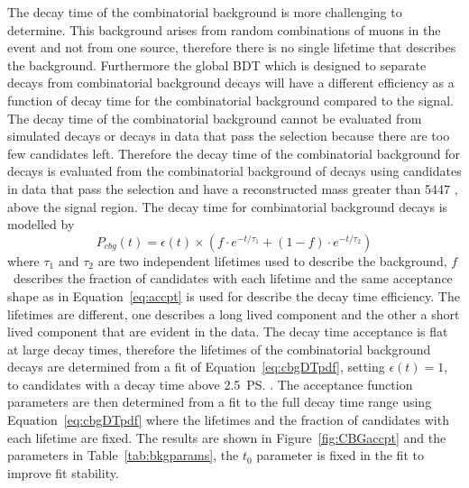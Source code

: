The decay time \pdf of the combinatorial background is more challenging to determine. This background arises from random combinations of muons in the event and not from one source, therefore there is no single lifetime that describes the background. Furthermore the global BDT which is designed to separate \bsmumu decays from combinatorial background decays will have a different efficiency as a function of decay time for the combinatorial background compared to the \bsmum signal. The decay time \pdf of the combinatorial background cannot be evaluated from simulated decays or decays in data that pass the \bsmumu selection because there are too few candidates left. %
Therefore the decay time \pdf of the combinatorial background for \bsmumu decays is evaluated from the combinatorial background of \bhh decays using candidates in data that pass the \bhh selection and have a reconstructed mass greater than 5447 \mevcc, above the \bs signal region. The decay time \pdf for combinatorial background decays is modelled by
\begin{equation}
P_{cbg}(t) = \epsilon(t)\times \left( f \cdot e^{-t/\tau_{1}} + (1-f)\cdot e^{-t/\tau_{2}} \right)
\label{eq:cbgDTpdf}
\end{equation}
where $\tau_{1}$ and $\tau_{2}$ are two independent lifetimes used to describe the background, $f$~describes the fraction of candidates with each lifetime and the same acceptance shape as in Equation~\ref{eq:accpt} is used for describe the decay time efficiency. The lifetimes are different, one describes a long lived component and the other a short lived component that are evident in the data. The decay time acceptance is flat at large decay times, therefore the lifetimes of the combinatorial background decays are determined from a \ml fit of Equation~\ref{eq:cbgDTpdf}, setting $\epsilon(t)=1$, to candidates with a decay time above 2.5~\ps. The acceptance function parameters are then determined from a \ml fit to the full decay time range using Equation~\ref{eq:cbgDTpdf} where the lifetimes and the fraction of candidates with each lifetime are fixed. The results are shown in Figure~\ref{fig:CBGaccpt} and the \pdf parameters in Table~\ref{tab:bkgparams}, the $t_{0}$ parameter is fixed in the fit to improve fit stability. 
